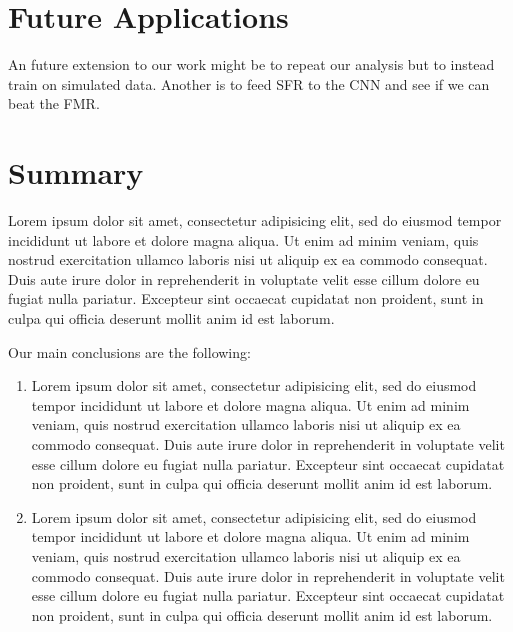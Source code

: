 \documentclass[fleqn,usenatbib]{mnras}
\begin{document}


\section{Future Applications}\label{sec:future}

An future extension to our work might be to repeat our analysis but to instead train on simulated data.
Another is to feed SFR to the CNN and see if we can beat the FMR.

\section{Summary}\label{sec:summary}



Lorem ipsum dolor sit amet, consectetur adipisicing elit, sed do eiusmod tempor incididunt ut labore et dolore magna aliqua. Ut enim ad minim veniam, quis nostrud exercitation ullamco laboris nisi ut aliquip ex ea commodo consequat. Duis aute irure dolor in reprehenderit in voluptate velit esse cillum dolore eu fugiat nulla pariatur. Excepteur sint occaecat cupidatat non proident, sunt in culpa qui officia deserunt mollit anim id est laborum.

Our main conclusions are the following:
\begin{enumerate}
	\item Lorem ipsum dolor sit amet, consectetur adipisicing elit, sed do eiusmod tempor incididunt ut labore et dolore magna aliqua. Ut enim ad minim veniam, quis nostrud exercitation ullamco laboris nisi ut aliquip ex ea commodo consequat. Duis aute irure dolor in reprehenderit in voluptate velit esse cillum dolore eu fugiat nulla pariatur. Excepteur sint occaecat cupidatat non proident, sunt in culpa qui officia deserunt mollit anim id est laborum.

	\item Lorem ipsum dolor sit amet, consectetur adipisicing elit, sed do eiusmod tempor incididunt ut labore et dolore magna aliqua. Ut enim ad minim veniam, quis nostrud exercitation ullamco laboris nisi ut aliquip ex ea commodo consequat. Duis aute irure dolor in reprehenderit in voluptate velit esse cillum dolore eu fugiat nulla pariatur. Excepteur sint occaecat cupidatat non proident, sunt in culpa qui officia deserunt mollit anim id est laborum.
\end{enumerate}
\end{document}
